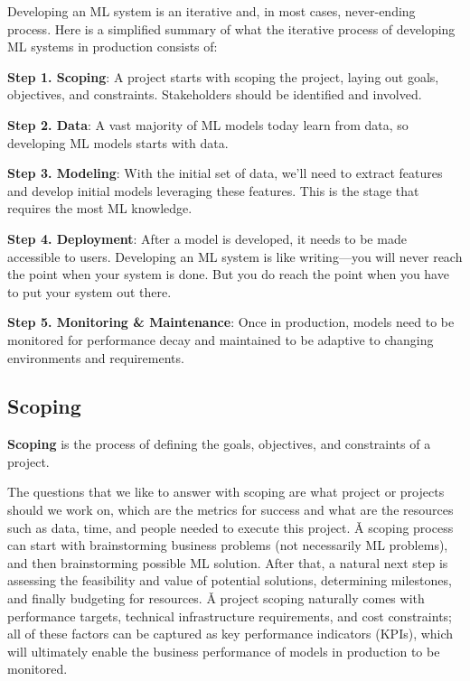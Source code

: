 Developing an ML system is an iterative and, in most cases, never-ending process. Here is a simplified summary of what
the iterative process of developing ML systems in production consists of:
\bit
\item \textbf{Step 1. Scoping}: A project starts with scoping the project, laying out goals, objectives, and
constraints.
Stakeholders should be identified and involved.
\item \textbf{Step 2. Data}: A vast majority of ML models today learn from data, so developing ML models starts with
data.
\item \textbf{Step 3. Modeling}: With the initial set of data, we'll need to extract features and develop initial models
leveraging these features. This is the stage that requires the most ML knowledge.
\item \textbf{Step 4. Deployment}: After a model is developed, it needs to be made accessible to users. Developing an ML
system is like writing—you will never reach the point when your system is done. But you do reach the point when you have
to put your system out there.
\item \textbf{Step 5. Monitoring \& Maintenance}: Once in production, models need to be monitored for performance decay
and maintained to be adaptive to changing environments and requirements.
\eit


\subsection{Scoping}

\bd[Scoping]
\textbf{Scoping} is the process of defining the goals, objectives, and constraints of a project.
\ed

The questions that we like to answer with scoping are what project or projects should we work on, which are the
metrics for success and what are the resources such as data, time, and people needed to execute this project. \v

A scoping process can start with brainstorming business problems (not necessarily ML problems), and then
brainstorming possible ML solution. After that, a natural next step is assessing the feasibility and value of
potential solutions, determining milestones, and finally budgeting for resources. \v

A project scoping naturally comes with performance targets, technical infrastructure requirements, and cost
constraints; all of these factors can be captured as key performance indicators (KPIs), which will ultimately enable
the business performance of models in production to be monitored.

